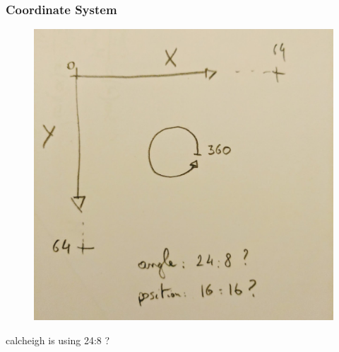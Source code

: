  
 


\subsubsection{Coordinate System}
\par
\begin{figure}[H]
  \centering
 \includegraphics[width=\textwidth]{imgs/coordinate_system.png}
\end{figure}
\par
calcheigh is using 24:8 ?


